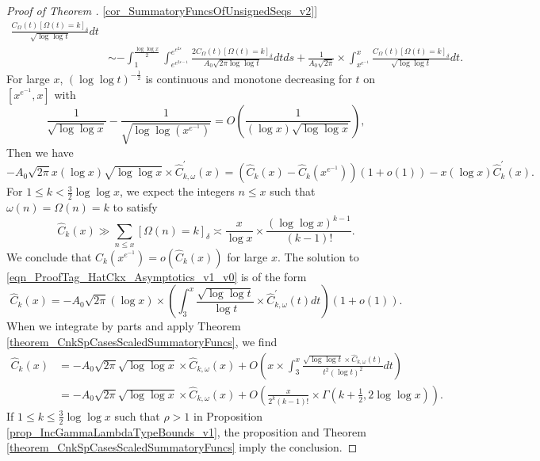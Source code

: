 \documentclass[11pt,reqno,a4letter]{article}
\newcommand{\hlocalref}[1]{\hyperref[#1]{\ref{#1}}}
\numberwithin{equation}{section}
\numberwithin{figure}{section}
\numberwithin{table}{section}
\newcommand{\Iverson}[1]{\ensuremath{\left[#1\right]_{\delta}}}
\theoremstyle{plain}
\numberwithin{theorem}{section}
\theoremstyle{definition}
\begin{document}
\begin{proof}[Proof of Theorem \hlocalref{cor_SummatoryFuncsOfUnsignedSeqs_v2}]
\begin{align*}
     \frac{C_{\Omega}(t) \Iverson{\Omega(t) = k}}{\sqrt{\log\log t}} dt \\ 
     & \sim -\int_1^{\frac{\log\log x}{2}} \int_{e^{e^{2s-1}}}^{e^{e^{2s}}} 
     \frac{2 C_{\Omega}(t) \Iverson{\Omega(t) = k}}{A_0 \sqrt{2\pi \log\log t}} dt ds +
     \frac{1}{A_0 \sqrt{2\pi}} \times \int_{x^{e^{-1}}}^x 
     \frac{C_{\Omega}(t) \Iverson{\Omega(t) = k}}{\sqrt{\log\log t}} dt. 
\end{align*} 
For large $x$, $(\log\log t)^{-\frac{1}{2}}$ is continuous and monotone decreasing for $t$ on 
$\left[x^{e^{-1}}, x\right]$ with 
\[
\frac{1}{\sqrt{\log\log x}} - \frac{1}{\sqrt{\log\log\left(x^{e^{-1}}\right)}} = 
     O\left(\frac{1}{(\log x) \sqrt{\log\log x}}\right), 
\]
Then we have 
\begin{equation} 
\label{eqn_ProofTag_HatCkx_Asymptotics_v1_v0}
     -A_0 \sqrt{2\pi} x (\log x) \sqrt{\log\log x} \times \widehat{C}_{k,\omega}^{\prime}(x) = 
     \left(\widehat{C}_k(x) - \widehat{C}_k\left(x^{e^{-1}}\right)\right)(1+o(1)) - 
     x (\log x) \widehat{C}_k^{\prime}(x). 
\end{equation} 
For $1 \leq k < \frac{3}{2} \log\log x$, we expect the integers $n \leq x$ 
such that $\omega(n) = \Omega(n) = k$ to satisfy 
\[
\widehat{C}_k(x) \gg \sum_{n \leq x} \Iverson{\Omega(n) = k} \asymp 
     \frac{x}{\log x} \times \frac{(\log\log x)^{k-1}}{(k-1)!}. 
\]
We conclude that 
$\widehat{C}_k\left(x^{e^{-1}}\right) = o\left(\widehat{C}_k(x)\right)$ for large $x$. 
The solution to \eqref{eqn_ProofTag_HatCkx_Asymptotics_v1_v0} is of the form 
\[
\widehat{C}_k(x) = -A_0\sqrt{2\pi}(\log x) \times \left(\int_3^x 
     \frac{\sqrt{\log\log t}}{\log t} \times \widehat{C}_{k,\omega}^{\prime}(t) dt\right)(1+o(1)). 
\]
When we integrate by parts and apply 
Theorem \hlocalref{theorem_CnkSpCasesScaledSummatoryFuncs}, we find 
\begin{align*}
\widehat{C}_k(x) & = -A_0 \sqrt{2\pi} \sqrt{\log\log x} \times \widehat{C}_{k,\omega}(x) + 
     O\left(x \times \int_3^x \frac{\sqrt{\log\log t} \times \widehat{C}_{k,\omega}(t)}{t^2 (\log t)^2} dt\right) \\ 
     & = -A_0 \sqrt{2\pi} \sqrt{\log\log x} \times \widehat{C}_{k,\omega}(x) + 
     O\left(\frac{x}{2^k (k-1)!} \times \Gamma\left(k+\frac{1}{2}, 2\log\log x\right)\right). 
\end{align*} 
If $1 \leq k \leq \frac{3}{2} \log\log x$ such that $\rho > 1$ in 
Proposition \hlocalref{prop_IncGammaLambdaTypeBounds_v1}, the proposition and 
Theorem \hlocalref{theorem_CnkSpCasesScaledSummatoryFuncs} 
imply the conclusion. 
\end{proof}
\end{document}
